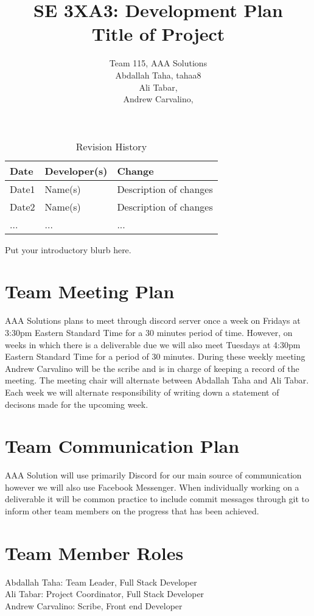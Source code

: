 \documentclass{article}
\title{SE 3XA3: Development Plan\\Title of Project}
\author{Team 115, AAA Solutions
		\\ Abdallah Taha, tahaa8
		\\ Ali Tabar, 
		\\ Andrew Carvalino,
}
\date{}
\begin{document}
\begin{table}[hp]
\caption{Revision History} \label{TblRevisionHistory}
\begin{tabularx}{\textwidth}{llX}
\toprule
\textbf{Date} & \textbf{Developer(s)} & \textbf{Change}\\
\midrule
Date1 & Name(s) & Description of changes\\
Date2 & Name(s) & Description of changes\\
... & ... & ...\\
\bottomrule
\end{tabularx}
\end{table}

\newpage

\maketitle

Put your introductory blurb here.

\section{Team Meeting Plan}
AAA Solutions plans to meet through discord server once a week on Fridays at 3:30pm Eastern Standard Time for a 30 minutes period of time. However, on weeks in which there is a deliverable due we will also meet Tuesdays at 4:30pm Eastern Standard Time for a period of 30 minutes. During these weekly meeting Andrew Carvalino will be the scribe and is in charge of keeping a record of the meeting. The meeting chair will alternate between Abdallah Taha and Ali Tabar. Each week we will alternate responsibility of writing down a statement of decisons made for the upcoming week. 

\section{Team Communication Plan}
AAA Solution will use primarily Discord for our main source of communication however we will also use Facebook Messenger. When individually working on a deliverable it will be common practice to include commit messages through git to inform other team members on the progress that has been achieved. 

\section{Team Member Roles}
Abdallah Taha: Team Leader, Full Stack Developer \\
Ali Tabar: Project Coordinator, Full Stack Developer \\
Andrew Carvalino: Scribe, Front end Developer \\
\end{document}
